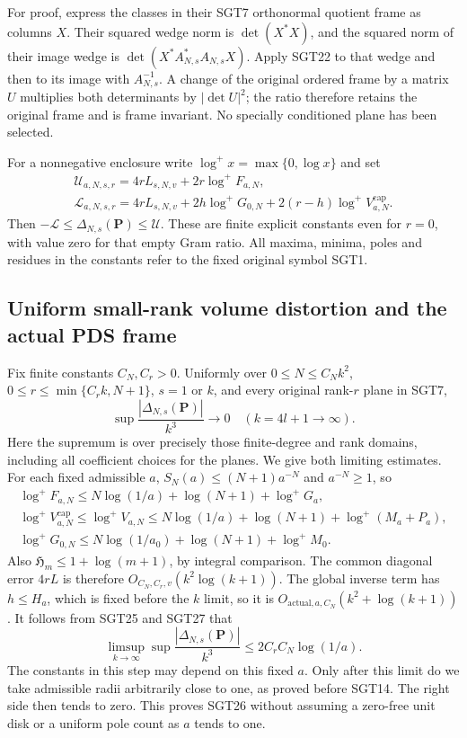 \documentclass[11pt,a4paper]{article}
\begin{document}
For proof, express the classes in their SGT7 orthonormal quotient
frame as columns $X$. Their squared wedge norm is $\det(X^*X)$,
and the squared norm of their image wedge is
$\det(X^*A_{N,s}^*A_{N,s}X)$. Apply SGT22 to that wedge and then
to its image with $A_{N,s}^{-1}$. A change of the original ordered
frame by a matrix $U$ multiplies both determinants by $|\det U|^2$;
the ratio therefore retains the original frame and is frame invariant.
No specially conditioned plane has been selected.

For a nonnegative enclosure write $\log^+x=\max\{0,\log x\}$ and set
\[
\begin{gathered}
 \mathcal U_{a,N,s,r}
    =4rL_{s,N,v}+2r\log^+F_{a,N},\\
 \mathcal L_{a,N,s,r}
    =4rL_{s,N,v}+2h\log^+G_{0,N}
                    +2(r-h)\log^+V_{a,N}^{\mathrm{cap}} .
\end{gathered}\tag{SGT25}
\]
Then $-\mathcal L\le\Delta_{N,s}(\mathbf P)\le\mathcal U$.
These are finite explicit constants even for $r=0$, with value zero
for that empty Gram ratio. All maxima, minima, poles and residues
in the constants refer to the fixed original symbol SGT1.

\subsection{Uniform small-rank volume distortion and the actual PDS frame}

Fix finite constants $C_N,C_r>0$. Uniformly over
$0\le N\le C_Nk^2$, $0\le r\le\min\{C_rk,N+1\}$,
$s=1$ or $k$, and every original rank-$r$ plane in SGT7,
\[
 \boxed{\qquad
 \sup\frac{|\Delta_{N,s}(\mathbf P)|}{k^3}
                   \longrightarrow0
 \quad(k=4l+1\longrightarrow\infty).
 \qquad}\tag{SGT26}
\]
Here the supremum is over precisely those finite-degree and rank
domains, including all coefficient choices for the planes.
We give both limiting estimates. For each fixed admissible $a$,
$S_N(a)\le(N+1)a^{-N}$ and $a^{-N}\ge1$, so
\[
\begin{gathered}
 \log^+F_{a,N}\le N\log(1/a)+\log(N+1)+\log^+G_a,\\
 \log^+V_{a,N}^{\mathrm{cap}}
 \le\log^+V_{a,N}
 \le N\log(1/a)+\log(N+1)+\log^+(M_a+P_a),\\
 \log^+G_{0,N}
 \le N\log(1/a_0)+\log(N+1)+\log^+M_0 .
\end{gathered}\tag{SGT27}
\]
Also $\mathfrak H_m\le1+\log(m+1)$, by integral comparison.
The common diagonal error $4rL$ is therefore
$O_{C_N,C_r,v}(k^2\log(k+1))$. The global inverse term has
$h\le H_a$, which is fixed before the $k$ limit, so it is
$O_{\mathrm{actual},a,C_N}(k^2+\log(k+1))$.
It follows from SGT25 and SGT27 that
\[
 \limsup_{k\to\infty}
 \sup\frac{|\Delta_{N,s}(\mathbf P)|}{k^3}
       \le 2C_rC_N\log(1/a).
 \tag{SGT28}
\]
The constants in this step may depend on this fixed $a$.
Only after this limit do we take admissible radii arbitrarily close
to one, as proved before SGT14. The right side then tends to zero.
This proves SGT26 without assuming a zero-free unit disk or a
uniform pole count as $a$ tends to one.
\end{document}
